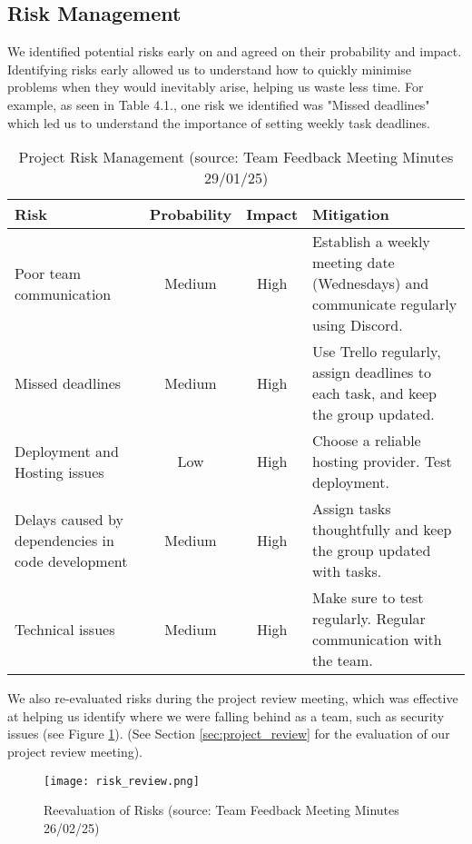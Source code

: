 \subsection{Risk Management}
We identified potential risks early on and agreed on their probability and impact. Identifying risks early allowed us to understand how to quickly minimise problems when they would inevitably arise, helping us waste less time. For example, as seen in Table 4.1., one risk we identified was "Missed deadlines" which led us to understand the importance of setting weekly task deadlines.

\begin{table}[H]
    \centering
    \caption{Project Risk Management (source: Team Feedback Meeting Minutes 29/01/25)}
    \label{table:project_risk}
    \begin{tabular}{|p{5cm}|c|c|p{6cm}|}
        \hline
        \textbf{Risk} & \textbf{Probability} & \textbf{Impact} & \textbf{Mitigation} \\
        \hline
        Poor team communication & Medium & High & Establish a weekly meeting date (Wednesdays) and communicate regularly using Discord. \\
        \hline
        Missed deadlines & Medium & High & Use Trello regularly, assign deadlines to each task, and keep the group updated. \\
        \hline
        Deployment and Hosting issues & Low & High & Choose a reliable hosting provider. Test deployment. \\
        \hline
        Delays caused by dependencies in code development & Medium & High & Assign tasks thoughtfully and keep the group updated with tasks. \\
        \hline
        Technical issues & Medium & High & Make sure to test regularly. Regular communication with the team. \\
        \hline
    \end{tabular}
\end{table}

We also re-evaluated risks during the project review meeting, which was effective at helping us identify where we were falling behind as a team, such as security issues (see Figure \ref{fig:reeval_risks}). (See Section \ref{sec:project_review} for the evaluation of our project review meeting).

\begin{figure}[H]
    \centering
    \texttt{[image: risk\_review.png]} %
    \caption{Reevaluation of Risks (source: Team Feedback Meeting Minutes 26/02/25)}
    \label{fig:reeval_risks}
\end{figure}

